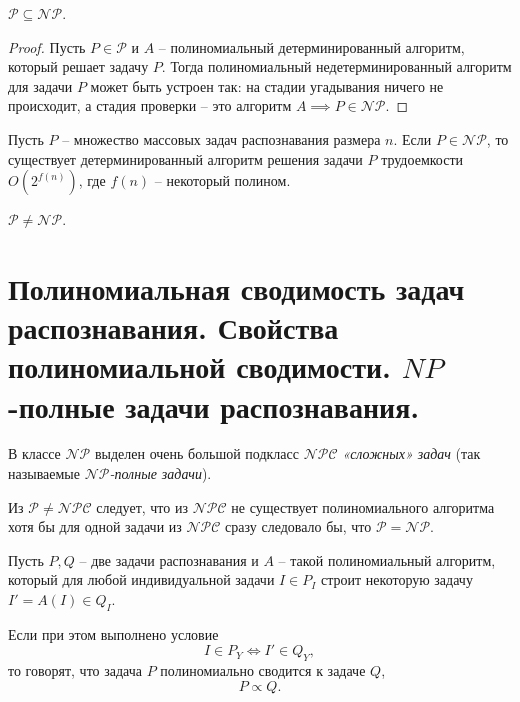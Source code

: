 \begin{theorem}
    $ \mathcal{P} \subseteq \mathcal{NP} $.
\end{theorem}

\begin{proof}
    Пусть $ P \in \mathcal{P} $ и $ A $ -- полиномиальный детерминированный алгоритм, который решает задачу $ P $. Тогда полиномиальный недетерминированный алгоритм для задачи $ P $ может быть устроен так: на стадии угадывания ничего не происходит, а стадия проверки -- это алгоритм $ A \implies P \in \mathcal{NP} $.
\end{proof}

\begin{theorem}
    Пусть $ P $ -- множество массовых задач распознавания размера $ n $. Если $ P \in \mathcal{NP} $, то существует детерминированный алгоритм решения задачи $ P $ трудоемкости $ O(2^{f(n)}) $, где $ f(n) $ -- некоторый полином.
\end{theorem}

\begin{note}[Гипотеза]
    $ \mathcal{P} \ne \mathcal{NP} $.
\end{note}

\section{Полиномиальная сводимость задач распознавания. Свойства полиномиальной сводимости. $NP$-полные задачи распознавания.}

\begin{note}
    В классе $ \mathcal{NP} $ выделен очень большой подкласс $ \mathcal{NPC} $ \emph{«сложных» задач} (так называемые \emph{$ \mathcal{NP} $-полные задачи}).

    Из $ \mathcal{P}\ne \mathcal{NPC} $ следует, что из $ \mathcal{NPC} $ не существует полиномиального алгоритма хотя бы для одной задачи из $ \mathcal{NPC} $ сразу следовало бы, что $ \mathcal{P} = \mathcal{NP} $.
\end{note}

\begin{definition}
    Пусть $ P,Q $ -- две задачи распознавания и $ A $ -- такой полиномиальный алгоритм, который для любой индивидуальной задачи $ I \in P_I $ строит некоторую задачу $ I'= A(I) \in Q_I $.

    Если при этом выполнено условие
    \[
        I \in P_Y \iff I' \in Q_Y,
    \]
    то говорят, что задача $ P $ полиномиально сводится к задаче $ Q $,
    \[
        P\propto Q.
    \]
\end{definition}

